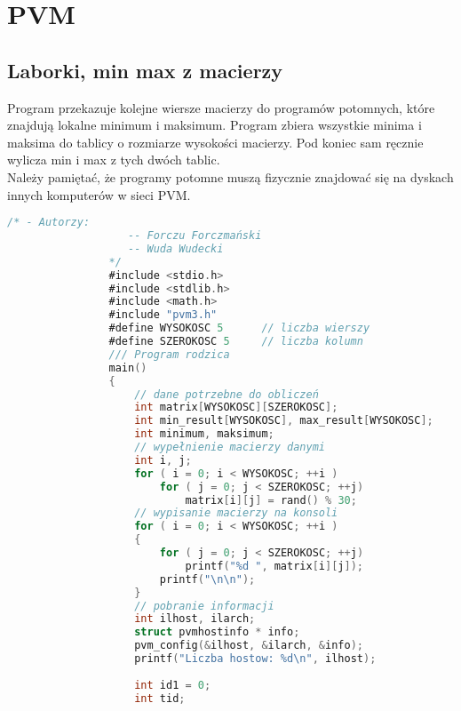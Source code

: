 \newpage
\section{PVM}
		\subsection{Laborki, min max z macierzy}
		Program przekazuje kolejne wiersze macierzy do programów potomnych, które znajdują lokalne minimum i maksimum. Program zbiera wszystkie minima i maksima do tablicy o rozmiarze wysokości macierzy. Pod koniec sam ręcznie wylicza min i max z tych dwóch tablic.\\
		Należy pamiętać, że programy potomne muszą fizycznie znajdować się na dyskach innych komputerów w sieci PVM.\\
			\begin{lstlisting}[language={C}]
				/* - Autorzy:
				   -- Forczu Forczmański
				   -- Wuda Wudecki
				*/
				#include <stdio.h>
				#include <stdlib.h>
				#include <math.h>
				#include "pvm3.h"
				#define WYSOKOSC 5		// liczba wierszy
				#define SZEROKOSC 5		// liczba kolumn
				/// Program rodzica
				main()
				{
					// dane potrzebne do obliczeń
					int matrix[WYSOKOSC][SZEROKOSC];
					int min_result[WYSOKOSC], max_result[WYSOKOSC];
					int minimum, maksimum;
					// wypełnienie macierzy danymi
					int i, j;
					for ( i = 0; i < WYSOKOSC; ++i )
						for ( j = 0; j < SZEROKOSC; ++j)
							matrix[i][j] = rand() % 30;
					// wypisanie macierzy na konsoli
					for ( i = 0; i < WYSOKOSC; ++i )
					{
						for ( j = 0; j < SZEROKOSC; ++j)
							printf("%d ", matrix[i][j]);
						printf("\n\n");
					}
					// pobranie informacji
					int ilhost, ilarch;
					struct pvmhostinfo * info;
					pvm_config(&ilhost, &ilarch, &info);
					printf("Liczba hostow: %d\n", ilhost);
					
					int id1 = 0;
					int tid;
				\end{lstlisting}
				\newpage
